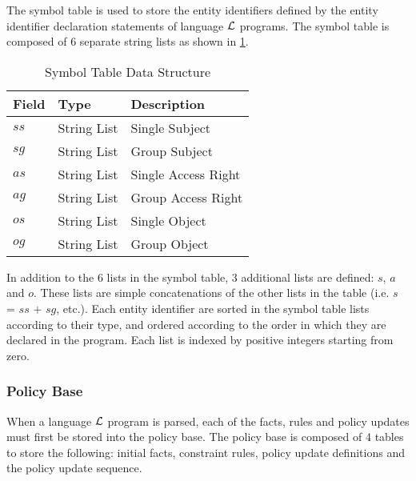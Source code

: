 \documentclass[11pt]{report}
\begin{document}
          The symbol table is used to store the entity identifiers defined by
          the entity identifier declaration statements of language ${\cal L}$
          programs. The symbol table is composed of 6 separate string lists
          as shown in \ref{tabl-polup-sytab}.

          \begin{table}[tbhp]
            \begin{center}
              \begin{tabular}[t]{|l|l|l|}
                \hline
                \textbf{Field} & \textbf{Type}  & \textbf{Description} \\
                \hline
                $ss$           & String List    & Single Subject \\
                \hline
                $sg$           & String List    & Group Subject \\
                \hline
                $as$           & String List    & Single Access Right \\
                \hline
                $ag$           & String List    & Group Access Right \\
                \hline
                $os$           & String List    & Single Object \\
                \hline
                $og$           & String List    & Group Object \\
                \hline
              \end{tabular}
            \end{center}
            \caption{Symbol Table Data Structure}
            \label{tabl-polup-sytab}
          \end{table}

          In addition to the 6 lists in the symbol table, 3 additional lists
          are defined: $s$, $a$ and $o$. These lists are simple concatenations
          of the other lists in the table (i.e. $s$ = $ss$ $+$ $sg$, etc.).
          Each entity identifier are sorted in the symbol table lists
          according to their type, and ordered according to the order in which
          they are declared in the program. Each list is indexed by positive
          integers starting from zero.

        \subsubsection{Policy Base}

          When a language ${\cal L}$ program is parsed, each of the facts,
          rules and policy updates must first be stored into the policy base.
          The policy base is composed of 4 tables to store the following:
          initial facts, constraint rules, policy update definitions and
          the policy update sequence.
\end{document}
